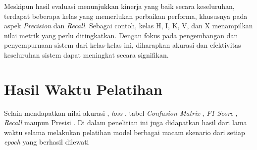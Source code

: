 Meskipun hasil evaluasi menunjukkan kinerja yang baik secara keseluruhan, terdapat beberapa kelas yang memerlukan perbaikan performa, khususnya pada aspek \textit{Precision} dan \textit{Recall}. Sebagai contoh, kelas H, I, K, V, dan X menampilkan nilai metrik yang perlu ditingkatkan. Dengan fokus pada pengembangan dan penyempurnaan sistem dari kelas-kelas ini, diharapkan akurasi dan efektivitas keseluruhan sistem dapat meningkat secara signifikan.


\section{Hasil Waktu Pelatihan}
Selain mendapatkan nilai akurasi , \textit{loss} , tabel \textit{Confusion Matrix} , \textit{F1-Score} , \textit{Recall} maupun Presisi . Di dalam penelitian ini juga didapatkan hasil dari lama waktu selama melakukan pelatihan model berbagai macam skenario dari setiap \textit{ epoch} yang berhasil dilewati 

